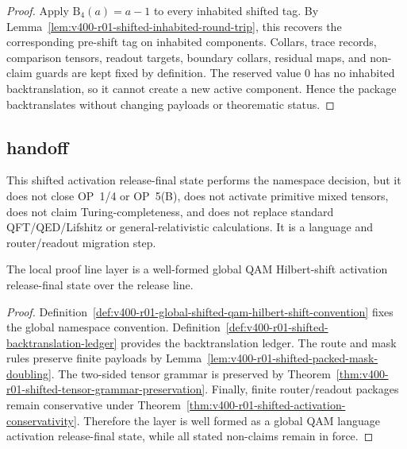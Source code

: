 \begin{proof}
Apply $\mathrm B_4(a)=a-1$ to every inhabited shifted tag. By
Lemma~\ref{lem:v400-r01-shifted-inhabited-round-trip}, this recovers the
corresponding pre-shift tag on inhabited components. Collars, trace records,
comparison tensors, readout targets, boundary collars, residual maps, and
non-claim guards are kept fixed by definition. The reserved value $0$ has no
inhabited backtranslation, so it cannot create a new active component. Hence
the package backtranslates without changing payloads or theorematic status.
\end{proof}

\subsection{handoff}
\label{subsec:v400-r01-handoff}

\begin{remark}
\label{rem:v400-r01-non-claims}
This shifted activation release-final state performs the namespace decision, but it does not
close OP~1/4 or OP~5(B), does not activate primitive mixed tensors, does not
claim Turing-completeness, and does not replace standard QFT/QED/Lifshitz or
general-relativistic calculations. It is a language and router/readout
migration step.
\end{remark}

\begin{theorem}
\label{thm:v400-r01-handoff-theorem}
The local proof line layer is a well-formed global QAM Hilbert-shift activation
release-final state over the  release line.
\end{theorem}

\begin{proof}
Definition~\ref{def:v400-r01-global-shifted-qam-hilbert-shift-convention} fixes the
global namespace convention. Definition~\ref{def:v400-r01-shifted-backtranslation-ledger}
provides the backtranslation ledger. The route and mask rules preserve finite
payloads by Lemma~\ref{lem:v400-r01-shifted-packed-mask-doubling}. The two-sided
tensor grammar is preserved by Theorem~\ref{thm:v400-r01-shifted-tensor-grammar-preservation}.
Finally, finite router/readout packages remain conservative under
Theorem~\ref{thm:v400-r01-shifted-activation-conservativity}. Therefore the layer
is well formed as a global QAM language activation release-final state, while all stated
non-claims remain in force.
\end{proof}



